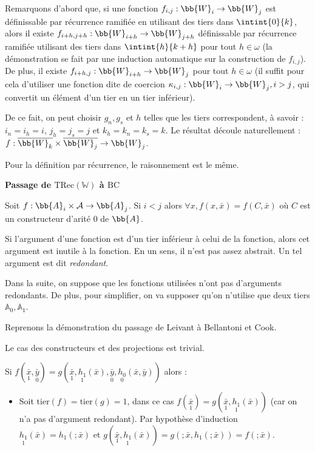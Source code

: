 \documentclass{article}
\newcommand{\bbA}{\mathbb{A}}
\newcommand{\TRec}[1]{\text{TRec}\left(\mathbb{#1}\right)}
\begin{document}
\begin{demo}
			Remarquons d'abord que, si une fonction $f_{i,j} : \bb{W}_i \to \bb{W}_j$ est définissable par récurrence ramifiée en utilisant des tiers dans $\intint{0}{k}$, alors il existe $f_{i+h, j+h} : \bb{W}_{i+h} \to \bb{W}_{j+h}$ définissable par récurrence ramifiée utilisant des tiers dans $\intint{h}{k+h}$ pour tout $h \in \omega$ (la démonstration se fait par une induction automatique sur la construction de $f_{i,j}$). De plus, il existe $f_{i+h,j} : \bb{W}_{i+h} \to \bb{W}_j$ pour tout $h \in \omega$ (il suffit pour cela d'utiliser une fonction dite de coercion $\kappa_{i,j} : \bb{W}_i \to \bb{W}_j, i>j$, qui convertit un élément d'un tier en un tier inférieur).
			
			De ce fait, on peut choisir $g_n, g_s$ et $h$ telles que les tiers correspondent, à savoir : $i_n = i_h = i$, $j_h = j_s = j$ et $k_h = k_n = k_s = k$. Le résultat découle naturellement : $f : \overline{\bb{W}_{k}} \times \overline{\bb{W}_{j}} \to \bb{W}_{j}$.
			
			Pour la définition par récurrence, le raisonnement est le même. 
			
			\espace
			
			\textbf{Passage de $\TRec{W}$ à $\text{BC}$}
			
			\begin{lemma}
				Soit $f : \bb{A}_i \times \mathcal{A} \to \bb{A}_j$. Si $i < j$ alors $\forall x, f(x, \bar{x}) = f(C, \bar{x})$ où $C$ est un constructeur d'arité $0$ de $\bb{A}$.
			\end{lemma}
			
			Si l'argument d'une fonction est d'un tier inférieur à celui de la fonction, alors cet argument est inutile à la fonction. En un sens, il n'est pas assez abstrait. Un tel argument est dit \emph{redondant}.
			
			Dans la suite, on suppose que les fonctions utilisées n'ont pas d'arguments redondants. De plus, pour simplifier, on va supposer qu'on n'utilise que deux tiers $\bbA_0, \bbA_1$.
			
			Reprenons la démonstration du passage de Leivant à Bellantoni et Cook.
			
			Le cas des constructeurs et des projections est trivial.
			
			Si $f(\underset{1}{\bar{x}}, \underset{0}{\bar{y}}) = g( \underset{1}{\bar{x}}, \underset{1}{h_1}(\bar{x}), \underset{0}{\bar{y}}, \underset{0}{h_0}(\bar{x}, \bar{y}))$ alors :
			
			\begin{itemize}
				\setlength{\itemsep}{-1mm}
				\item 	Soit $\text{tier}(f) = \text{tier}(g) = 1$, dans ce cas $f(\underset{1}{\bar{x}}) = g( \underset{1}{\bar{x}}, \underset{1}{h_1}(\bar{x}))$ (car on n'a pas d'argument redondant). Par hypothèse d'induction $\underset{1}{h_1}(\bar{x}) = h_1(;\bar{x})$ et $g(\underset{1}{\bar{x}}, \underset{1}{h_1}(\bar{x})) = g(; \bar{x}, h_1(;\bar{x})) = f(; \bar{x})$.
				

\end{itemize}
\end{demo}
\end{document}
